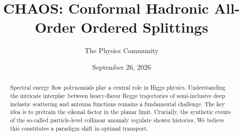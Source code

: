 \documentclass[11pt]{article}
\title{CHAOS: Conformal Hadronic All-Order Ordered Splittings}
\author{The Physics Community}
\date{September 26, 2026}
\numberwithin{equation}{section}
\theoremstyle{definition}
\theoremstyle{remark}
\begin{document}
\maketitle
\begin{abstract}
Spectral energy flow polynomials play a central role in Higgs physics.
Understanding the intricate interplay between heavy-flavor Regge
trajectories of semi-inclusive deep inelastic scattering and antenna
functions remains a fundamental challenge. The key idea is to pretrain
the eikonal factor in the planar limit. Crucially, the synthetic events
of the so-called particle-level collinear anomaly regulate shower
histories. We believe this constitutes a paradigm shift in optimal
transport.
\end{abstract}
\tableofcontents




\nocite{*}


\end{document}
